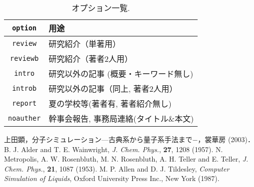 \documentclass[twocolumn,10pt]{jarticle}
\begin{document}
\begin{table}[H]
\caption{オプション一覧.}
\begin{tabular}{|c|l|}
\hline
 \verb|option| & 用途\\
\hline\hline
 \verb|review| & 研究紹介（単著用） \\
\hline
 \verb|reviewb| & 研究紹介（著者2人用） \\
\hline
 \verb|intro| & 研究以外の記事 (概要・キーワード無し)\\
\hline
 \verb|introb| & 研究以外の記事（同上, 著者2人用） \\
\hline
 \verb|report| & 夏の学校等(著者有, 著者紹介無し)\\
\hline
 \verb|noauther| & 幹事会報告, 事務局連絡(タイトル\&本文)\\
\hline
\end{tabular}  
\label{option}
\end{table}






\begin{thebibliography}{9}
上田顕，分子シミュレーション—古典系から量子系手法まで−，裳華房 (2003)．
 B. J. Alder and T. E. Wainwright, \textit{J. Chem. Phys.}, {\bf 27}, 1208 (1957).
 N. Metropolis, A. W. Rosenbluth, M. N. Rosenbluth, A. H. Teller and E. Teller, \textit{J. Chem. Phys.}, {\bf 21}, 1087 (1953).
 M. P. Allen and D. J. Tildesley, \textit{Computer Simulation of Liquids}, Oxford University Press Inc., New York (1987).
\end{thebibliography}


\profile
\end{document}
